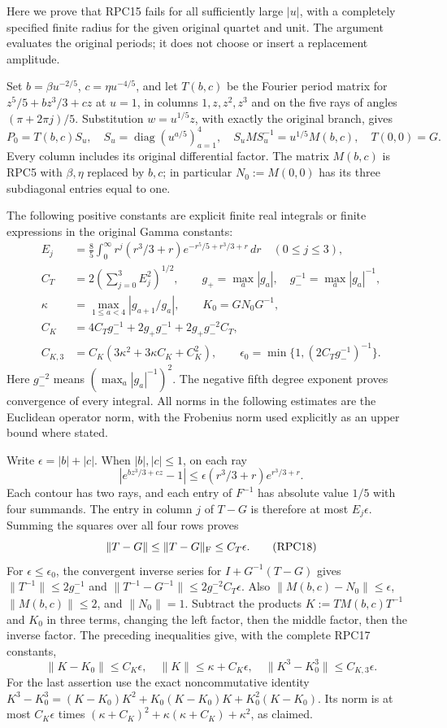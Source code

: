 \documentclass[11pt,a4paper]{article}
\begin{document}
Here we prove that RPC15 fails for all sufficiently large $|u|$,
with a completely specified finite radius for the given original
quartet and unit. The argument evaluates the original periods; it
does not choose or insert a replacement amplitude.

Set $b=\beta u^{-2/5}$, $c=\eta u^{-4/5}$, and let $T(b,c)$
be the Fourier period matrix for
$z^5/5+bz^3/3+cz$ at $u=1$, in columns $1,z,z^2,z^3$ and on
the five rays of angles $(\pi+2\pi j)/5$. Substitution
$w=u^{1/5}z$, with exactly the original branch, gives
\[
 P_0=T(b,c)S_u,\quad S_u=\operatorname{diag}(u^{a/5})_{a=1}^4,
 \quad S_uMS_u^{-1}=u^{1/5}M(b,c),\quad T(0,0)=G.
 \tag{RPC16}
\]
Every column includes its original differential factor. The matrix
$M(b,c)$ is RPC5 with $\beta,\eta$ replaced by $b,c$; in particular
$N_0:=M(0,0)$ has its three subdiagonal entries equal to one.

The following positive constants are explicit finite real integrals
or finite expressions in the original Gamma constants:
\[
 \begin{split}
 E_j&=\frac85\int_0^\infty r^j(r^3/3+r)
                    e^{-r^5/5+r^3/3+r}\,dr\quad(0\le j\le3),\\
 C_T&=2\left(\sum_{j=0}^3E_j^2\right)^{1/2},\qquad
 g_+=\max_a|g_a|,\quad g_-^{-1}=\max_a|g_a|^{-1},\\
 \kappa&=\max_{1\le a<4}|g_{a+1}/g_a|,\qquad
 K_0=GN_0G^{-1},\\
 C_K&=4C_Tg_-^{-1}+2g_+g_-^{-1}
                       +2g_+g_-^{-2}C_T,\\
 C_{K,3}&=C_K(3\kappa^2+3\kappa C_K+C_K^2),\qquad
 \epsilon_0=\min\{1,(2C_Tg_-^{-1})^{-1}\}.
 \end{split}
 \tag{RPC17}
\]
Here $g_-^{-2}$ means $(\max_a|g_a|^{-1})^2$. The negative fifth
degree exponent proves convergence of every integral. All norms in
the following estimates are the Euclidean operator norm, with the
Frobenius norm used explicitly as an upper bound where stated.

Write $\epsilon=|b|+|c|$. When $|b|,|c|\le1$, on each ray
\[
 |e^{bz^3/3+cz}-1|
 \le \epsilon(r^3/3+r)e^{r^3/3+r}.
\]
Each contour has two rays, and each entry of $F^{-1}$ has absolute
value $1/5$ with four summands. The entry in column $j$ of
$T-G$ is therefore at most $E_j\epsilon$. Summing the squares
over all four rows proves
\[
 \|T-G\|\le\|T-G\|_{\rm F}\le C_T\epsilon.
 \tag{RPC18}
\]
For $\epsilon\le\epsilon_0$, the convergent inverse series for
$I+G^{-1}(T-G)$ gives
$\|T^{-1}\|\le2g_-^{-1}$ and
$\|T^{-1}-G^{-1}\|\le2g_-^{-2}C_T\epsilon$.
Also $\|M(b,c)-N_0\|\le\epsilon$, $\|M(b,c)\|\le2$,
and $\|N_0\|=1$. Subtract the products
$K:=T M(b,c)T^{-1}$ and $K_0$ in three terms, changing the left
factor, then the middle factor, then the inverse factor. The preceding
inequalities give, with the complete RPC17 constants,
\[
 \|K-K_0\|\le C_K\epsilon,\quad
 \|K\|\le\kappa+C_K\epsilon,\quad
 \|K^3-K_0^3\|\le C_{K,3}\epsilon.
 \tag{RPC19}
\]
For the last assertion use the exact noncommutative identity
$K^3-K_0^3=(K-K_0)K^2+K_0(K-K_0)K+K_0^2(K-K_0)$.
Its norm is at most $C_K\epsilon$ times
$(\kappa+C_K)^2+\kappa(\kappa+C_K)+\kappa^2$, as claimed.
\end{document}
